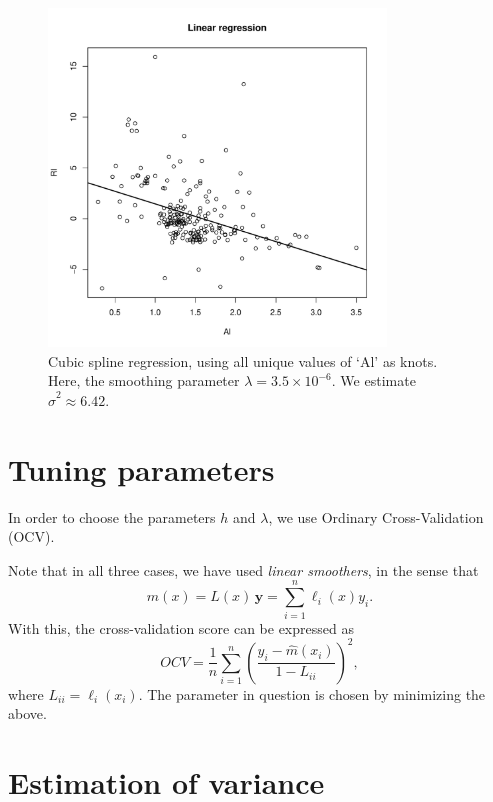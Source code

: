 \documentclass[10pt]{article}
\begin{document}
    \begin{figure}[H]
    \begin{center}
        \includegraphics[page = 6, width = 0.8\textwidth]{glass.pdf}
    \end{center}
    \caption{
        Cubic spline regression, using all unique values of `Al' as knots.
        Here, the smoothing parameter $\lambda = 3.5\times 10^{-6}$.
        We estimate $\widehat{\sigma}^2 \approx 6.42$.
    }
    \label{fig:glass_spline}
    \end{figure}



    \section{Tuning parameters}

    In order to choose the parameters $h$ and $\lambda$, we use Ordinary
    Cross-Validation (OCV).

    Note that in all three cases, we have used \emph{linear smoothers}, in the
    sense that \[
        \widehat{m}(x) = L(x)\, \bm{y} = \sum_{i = 1}^n \ell_i(x) y_i.
    \] With this, the cross-validation score can be expressed as \[
        OCV = \frac{1}{n} \sum_{i = 1}^n \left(\frac{y_i - \widehat{m}(x_i)}{1
        - L_{ii}}\right)^2,
    \] where $L_{ii} = \ell_i(x_i)$. The parameter in question is chosen by
    minimizing the above.


    \section{Estimation of variance}
\end{document}
